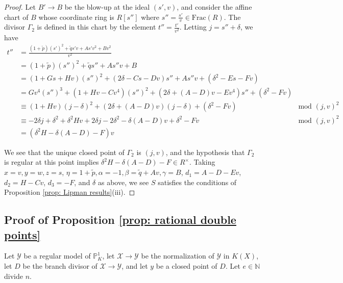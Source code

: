 \documentclass[12pt]{amsart}
\numberwithin{equation}{section}
\theoremstyle{definition}
\newcommand{\N}{\mathbb N}
\renewcommand{\P}{\mathbb P}
\newcommand{\X}{\mathcal{X}}
\newcommand{\Y}{\mathcal{Y}}
\newcommand{\tx}[1]{\text{#1}}
\begin{document}
\begin{proof}
    Let $B'\to B$ be the blow-up at the ideal $(s',v)$, and consider the affine chart of $B$ whose coordinate ring is $R[s'']$ where $s''=\frac{s'}{v}\in\tx{Frac}(R)$. The divisor $\Gamma_2$ is defined in this chart by the element $t''=\frac{t'}{v^2}$. Letting $j=s''+\delta$, we have
    \begin{align*}
    t''&=\frac{(1+\tilde{p})(s')^2+\tilde{q}s'v+As'v^2+Bv^2}{v^2}\\
        &=(1+\tilde{p})(s'')^2+\tilde{q}s''+As''v+B&\\
        &=(1+Gs+Hv)(s'')^2+(2\delta-Cs-Dv)s''+As''v+(\delta^2-Es-Fv)&\\
        &=Gv^4(s'')^3+(1+Hv-Cv^4)(s'')^2+(2\delta+(A-D)v-Ev^4)s''+(\delta^2-Fv)&\\
        &\equiv(1+Hv)(j-\delta)^2+(2\delta+(A-D)v)(j-\delta)+(\delta^2-Fv)&\tx{mod }(j,v)^2\\
        &\equiv -2\delta j+\delta^2 +\delta^2Hv+2\delta j-2\delta^2-\delta(A-D)v+\delta^2-Fv&\tx{mod }(j,v)^2\\
        &=(\delta^2H-\delta(A-D)-F)v
    \end{align*}
    
    We see that the unique closed point of $\Gamma_2$ is $(j,v)$, and the hypothesis that $\Gamma_2$ is regular at this point implies $\delta^2H-\delta(A-D)-F\in R^\times$. Taking $x=v,y=w,z=s$, $\eta=1+\tilde{p},\alpha=-1,\beta=\tilde{q}+Av,\gamma=B$, $d_1=A-D-Ev$, $d_2=H-Cv$, $d_3=-F$, and $\delta$ as above, we see $S$ satisfies the conditions of Proposition \ref{prop: Lipman results}(iii). 
\end{proof}

\subsection{Proof of Proposition \ref{prop: rational double points}}\hfill

Let $\Y$ be a regular model of $\P^1_K$, let $\X\to\Y$ be the normalization of $\Y$ in $K(X)$, let $D$ be the branch divisor of $\X\to\Y$, and let $y$ be a closed point of $D$. Let $e\in\N$ divide $n$.
\end{document}
